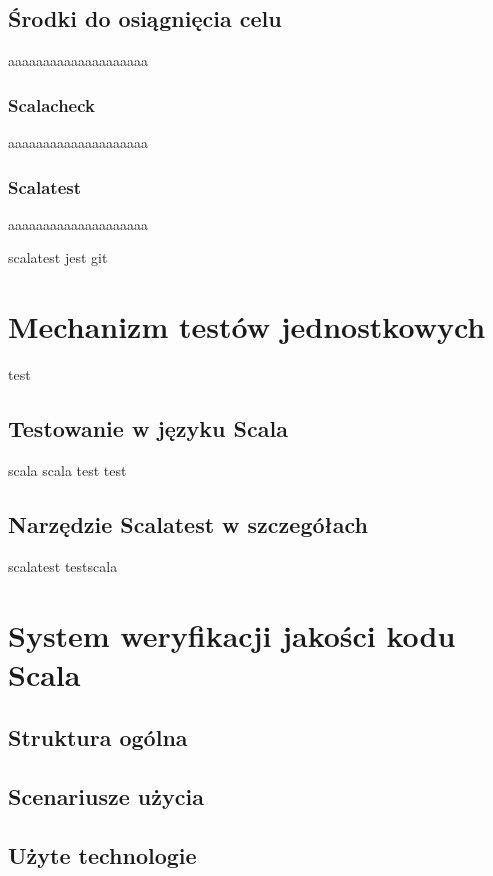 \documentclass[brudnopis]{xmgr}
\begin{document}
    
\section{Środki do osiągnięcia celu}

aaaaaaaaaaaaaaaaaaaa

\subsection{Scalacheck}

aaaaaaaaaaaaaaaaaaaa

\subsection{Scalatest} 

aaaaaaaaaaaaaaaaaaaa

scalatest jest git
      
\chapter{Mechanizm testów jednostkowych}

test
    
\section{Testowanie w języku Scala}

scala scala test test 
      
\section{Narzędzie Scalatest w szczegółach}

scalatest testscala

\chapter{System weryfikacji jakości kodu Scala}

\section{Struktura ogólna}

\section{Scenariusze użycia}

\section{Użyte technologie}
\end{document}
